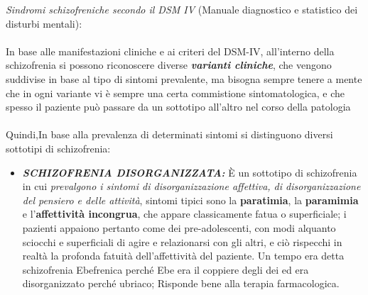 \emph{Sindromi schizofreniche secondo il DSM IV} (Manuale diagnostico e
statistico dei disturbi mentali):
\\\\
In base alle manifestazioni cliniche e ai criteri del DSM-IV,
all'interno della schizofrenia si possono riconoscere diverse
\textbf{\emph{varianti cliniche}}, che vengono suddivise in base al tipo
di sintomi prevalente, ma bisogna sempre tenere a mente che in ogni
variante vi è sempre una certa commistione sintomatologica, e che spesso
il paziente può passare da un sottotipo all'altro nel corso della
patologia
\\\\
Quindi,In base alla prevalenza di determinati sintomi si distinguono
diversi sottotipi di schizofrenia:

\begin{itemize}
\item
  \textbf{\emph{SCHIZOFRENIA DISORGANIZZATA:}} È un sottotipo di
  schizofrenia in cui \emph{prevalgono i sintomi di disorganizzazione
  affettiva, di disorganizzazione del pensiero e delle attività},
  sintomi tipici sono la \textbf{paratimia}, la \textbf{paramimia} e
  l'\textbf{affettività incongrua}, che appare classicamente fatua o
  superficiale; i pazienti appaiono pertanto come dei pre-adolescenti,
  con modi alquanto sciocchi e superficiali di agire e relazionarsi con
  gli altri, e ciò rispecchi in realtà la profonda fatuità
  dell'affettività del paziente. Un tempo era detta schizofrenia
  Ebefrenica perché Ebe era il coppiere degli dei ed era disorganizzato
  perché ubriaco; Risponde bene alla terapia farmacologica.


\end{itemize}
